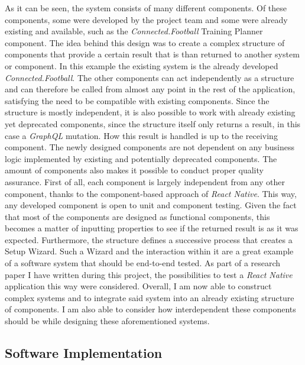 As it can be seen, the system consists of many different components. Of these components, some were developed by the project team and some were already existing and available, such as the \textit{Connected.Football} Training Planner component. The idea behind this design was to create a complex structure of components that provide a certain result that is than returned to another system or component. In this example the existing system is the already developed \textit{Connected.Football}. The other components can act independently as a structure and can therefore be called from almost any point in the rest of the application, satisfying the need to be compatible with existing components. Since the structure is mostly independent, it is also possible to work with already existing yet deprecated components, since the structure itself only returns a result, in this case a \textit{GraphQL} mutation. How this result is handled is up to the receiving component. The newly designed components are not dependent on any business logic implemented by existing and potentially deprecated components.
\newline
The amount of components also makes it possible to conduct proper quality assurance. First of all, each component is largely independent from any other component, thanks to the component-based approach of \textit{React Native}. This way, any developed component is open to unit and component testing. Given the fact that most of the components are designed as functional components, this becomes a matter of inputting properties to see if the returned result is as it was expected.
\newline
Furthermore, the structure defines a successive process that creates a Setup Wizard. Such a Wizard and the interaction within it are a great example of a software system that should be end-to-end tested. As part of a research paper I have written during this project, the possibilities to test a \textit{React Native} application this way were considered.
\newline
Overall, I am now able to construct complex systems and to integrate said system into an already existing structure of components. I am also able to consider how interdependent these components should be while designing these aforementioned systems.

\subsection{Software Implementation}
\label{ssec:software_implementation}

